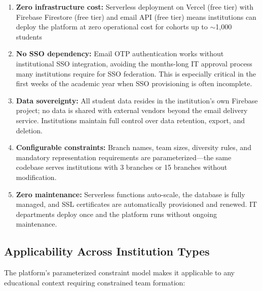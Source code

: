 \documentclass[conference]{IEEEtran}
\begin{document}
\begin{enumerate}[noitemsep,topsep=3pt]
    \item \textbf{Zero infrastructure cost:} Serverless deployment on Vercel (free tier) with Firebase Firestore (free tier) and email API (free tier) means institutions can deploy the platform at zero operational cost for cohorts up to $\sim$1,000 students

    \item \textbf{No SSO dependency:} Email OTP authentication works without institutional SSO integration, avoiding the months-long IT approval process many institutions require for SSO federation. This is especially critical in the first weeks of the academic year when SSO provisioning is often incomplete.

    \item \textbf{Data sovereignty:} All student data resides in the institution's own Firebase project; no data is shared with external vendors beyond the email delivery service. Institutions maintain full control over data retention, export, and deletion.

    \item \textbf{Configurable constraints:} Branch names, team sizes, diversity rules, and mandatory representation requirements are parameterized---the same codebase serves institutions with 3 branches or 15 branches without modification.

    \item \textbf{Zero maintenance:} Serverless functions auto-scale, the database is fully managed, and SSL certificates are automatically provisioned and renewed. IT departments deploy once and the platform runs without ongoing maintenance.
\end{enumerate}

\subsection{Applicability Across Institution Types}

The platform's parameterized constraint model makes it applicable to any educational context requiring constrained team formation:
\end{document}
